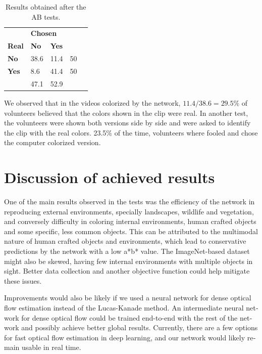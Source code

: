 \documentclass[12pt,openright,twoside,a4paper,english]{abntex2}
\begin{document}
\begin{otherlanguage}{english}
\begin{table}[H]
\centering
\begin{tabular}{l|l|l|ll}
\cline{2-3}
                                    & \multicolumn{2}{l|}{\textbf{Chosen}} &                           &  \\ \cline{1-3}
\multicolumn{1}{|l|}{\textbf{Real}} & \textbf{No}      & \textbf{Yes}      &                           &  \\ \cline{1-4}
\multicolumn{1}{|l|}{\textbf{No}}   & 38.6             & 11.4              & \multicolumn{1}{l|}{50} &  \\ \cline{1-4}
\multicolumn{1}{|l|}{\textbf{Yes}}  & 8.6              & 41.4              & \multicolumn{1}{l|}{50} &  \\ \cline{1-4}
                                    & 47.1             & 52.9              &                           &  \\ \cline{2-3}
\end{tabular}
\label{table:ABresults}
\caption{Results obtained after the AB tests.}
\end{table}

We observed that in the videos colorized by the network, \(11.4/38.6 = 29.5\% \) of volunteers  believed that the colors shown in the clip were real. In another test, the volunteers were shown both versions side by side and were asked to identify the clip with the real colors. 23.5\% of the time, volunteers where fooled and chose the computer colorized version.

\chapter{Discussion of achieved results}
One of the main results observed in the tests was the efficiency of the network in reproducing external environments, specially landscapes, wildlife and vegetation, and conversely difficulty in coloring internal environments, human crafted objects and some specific, less common objects. This can be attributed to the multimodal nature of human crafted objects and environments, which lead to conservative predictions by the network with a low a*b* value.  The ImageNet-based dataset might also be skewed, having few internal environments with multiple objects in sight. Better data collection and another objective function could help mitigate these issues.

Improvements would also be likely if we used a neural network for dense optical flow estimation instead of the Lucas-Kanade method. An intermediate neural network for dense optical flow could be trained end-to-end with the rest of the network and possibly achieve better global results. Currently, there are a few options for fast optical flow estimation in deep learning, and our network would likely remain usable in real time.





\end{otherlanguage}
\end{document}
